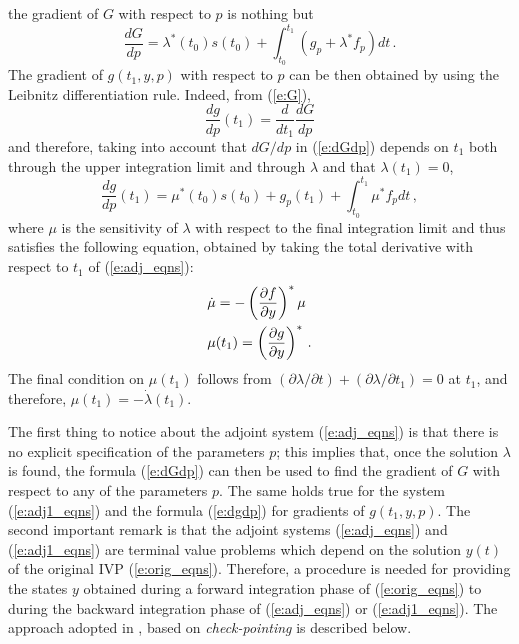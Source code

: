 the gradient of $G$ with respect to $p$ is nothing but
\begin{equation}\label{e:dGdp}
\frac{dG}{dp} = \lambda^*(t_0) s(t_0) + 
\int_{t_0}^{t_1} \left( g_p + \lambda^* f_p \right) dt \, .
\end{equation}
The gradient of $g(t_1,y,p)$ with respect to $p$ can be then obtained
by using the Leibnitz differentiation rule. Indeed, from (\ref{e:G}),
\begin{equation*}
\frac{dg}{dp}(t_1) = \frac{d}{dt_1}\frac{dG}{dp}
\end{equation*}
and therefore, taking into account that $dG/dp$ in (\ref{e:dGdp}) depends on $t_1$
both through the upper integration limit and through $\lambda$ and that $\lambda(t_1) = 0$, 
\begin{equation}\label{e:dgdp}
\frac{dg}{dp}(t_1) = \mu^*(t_0) s(t_0) + g_p(t_1) +
\int_{t_0}^{t_1} \mu^* f_p dt \, ,
\end{equation}
where $\mu$ is the sensitivity of $\lambda$ with respect to the final integration 
limit and thus satisfies the following equation, obtained by taking the total derivative
with respect to $t_1$ of (\ref{e:adj_eqns}):
\begin{equation}\label{e:adj1_eqns}
\begin{split}
&{\dot \mu} = -\left( \frac{\partial f}{\partial y} \right)^* \mu \\ 
&\mu(t_1) = \left( \frac{\partial g}{\partial y} \right)^* \, .
\end{split}
\end{equation}
The final condition on $\mu(t_1)$ follows from 
$(\partial\lambda/\partial t) + (\partial\lambda/\partial t_1) = 0$ at $t_1$, and
therefore, $\mu(t_1) = -{\dot\lambda}(t_1)$. 

The first thing to notice about the adjoint system (\ref{e:adj_eqns}) is that there is 
no explicit specification of the parameters $p$; this implies that, once the solution
$\lambda$ is found, the formula (\ref{e:dGdp}) can then be used to find the gradient
of $G$ with respect to any of the parameters $p$. The same holds true for the system
(\ref{e:adj1_eqns}) and the formula (\ref{e:dgdp}) for gradients of $g(t_1,y,p)$. 
The second important remark is that the adjoint systems (\ref{e:adj_eqns}) and
(\ref{e:adj1_eqns}) are terminal value problems which depend on the solution $y(t)$ 
of the original IVP (\ref{e:orig_eqns}). Therefore, a procedure is needed for providing 
the states $y$ obtained during a forward integration phase of (\ref{e:orig_eqns}) to
{\cvodes} during the backward integration phase of (\ref{e:adj_eqns}) or (\ref{e:adj1_eqns}).
The approach adopted in {\cvodes}, based on {\em check-pointing} is described below.

